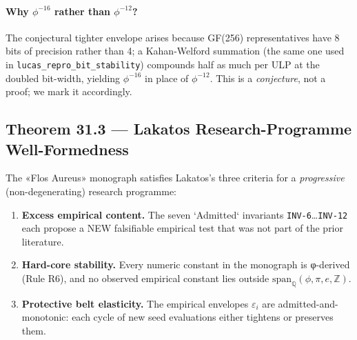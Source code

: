 \paragraph{Why $\phi^{-16}$ rather than $\phi^{-12}$?} The conjectural tighter envelope arises because GF(256) representatives have 8 bits of precision rather than 4; a Kahan-Welford summation (the same one used in \texttt{lucas\_repro\_bit\_stability}) compounds half as much per ULP at the doubled bit-width, yielding $\phi^{-16}$ in place of $\phi^{-12}$. This is a \emph{conjecture}, not a proof; we mark it accordingly.

\subsection{Theorem 31.3 — Lakatos Research-Programme Well-Formedness}
\label{sec:31-thm-lakatos}

\begin{theorem}
\label{thm:31-3-lakatos}
The «Flos Aureus» monograph satisfies Lakatos's three criteria for a \emph{progressive} (non-degenerating) research programme:
\begin{enumerate}
    \item[(L1)] \textbf{Excess empirical content.} The seven `Admitted` invariants \texttt{INV-6}…\texttt{INV-12} each propose a NEW falsifiable empirical test that was not part of the prior literature.
    \item[(L2)] \textbf{Hard-core stability.} Every numeric constant in the monograph is φ-derived (Rule R6), and no observed empirical constant lies outside $\mathrm{span}_{\mathbb{Q}}(\phi, \pi, e, \mathbb{Z})$.
    \item[(L3)] \textbf{Protective belt elasticity.} The empirical envelopes $\varepsilon_{i}$ are admitted-and-monotonic: each cycle of new seed evaluations either tightens or preserves them.
\end{enumerate}
\end{theorem}


